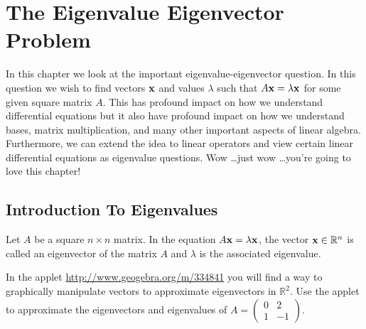\chapter{The Eigenvalue Eigenvector Problem}
In this chapter we look at the important eigenvalue-eigenvector question.  In this
question we wish to find vectors ${\bf x}$ and values $\lambda$ such that $A {\bf x} = \lambda
{\bf x}$ for some given square matrix $A$.  This has profound impact on how we understand
differential equations but it also have profound impact on how we understand bases, matrix
multiplication, and many other important aspects of linear algebra.  Furthermore, we can
extend the idea to linear operators and view certain linear differential equations as eigenvalue
questions.  Wow \ldots just wow \ldots you're going to love this chapter!

\section{Introduction To Eigenvalues}
\begin{definition}
    Let $A$ be a square $n\times n$ matrix.  In the equation $A {\bf x} = \lambda {\bf x}$, the
    vector ${\bf x} \in \mathbb{R}^n$ is called an eigenvector of the matrix $A$ and $\lambda$
    is the associated eigenvalue.
\end{definition}

\begin{problem}
    In the applet 
        \href{http://www.geogebra.org/m/334841}{http://www.geogebra.org/m/334841}
    you will find a way to graphically manipulate vectors to approximate eigenvectors in
    $\mathbb{R}^2$.  Use the applet to approximate the eigenvectors and eigenvalues of $A
    = \begin{pmatrix} 0 & 2 \\ 1 & -1 \end{pmatrix}$.
\end{problem}


